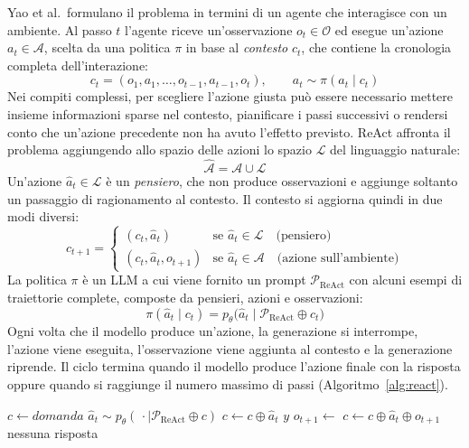 Yao et al.\ formulano il problema in termini di un agente che interagisce con un ambiente. Al passo $t$ l'agente riceve un'osservazione $o_t \in \mathcal{O}$ ed esegue un'azione $a_t \in \mathcal{A}$, scelta da una politica $\pi$ in base al \emph{contesto} $c_t$, che contiene la cronologia completa dell'interazione:
\[
c_t = (o_1, a_1, \dots, o_{t-1}, a_{t-1}, o_t), \qquad a_t \sim \pi(a_t \mid c_t)
\]
Nei compiti complessi, per scegliere l'azione giusta può essere necessario mettere insieme informazioni sparse nel contesto, pianificare i passi successivi o rendersi conto che un'azione precedente non ha avuto l'effetto previsto. ReAct affronta il problema aggiungendo allo spazio delle azioni lo spazio $\mathcal{L}$ del linguaggio naturale:
\[
\hat{\mathcal{A}} = \mathcal{A} \cup \mathcal{L}
\]
Un'azione $\hat{a}_t \in \mathcal{L}$ è un \emph{pensiero}, che non produce osservazioni e aggiunge soltanto un passaggio di ragionamento al contesto. Il contesto si aggiorna quindi in due modi diversi:
\[
c_{t+1} =
\begin{cases}
(c_t, \hat{a}_t) & \text{se } \hat{a}_t \in \mathcal{L} \quad \text{(pensiero)} \\[2pt]
(c_t, \hat{a}_t, o_{t+1}) & \text{se } \hat{a}_t \in \mathcal{A} \quad \text{(azione sull'ambiente)}
\end{cases}
\]
La politica $\pi$ è un LLM a cui viene fornito un prompt $\mathcal{P}_{\text{ReAct}}$ con alcuni esempi di traiettorie complete, composte da pensieri, azioni e osservazioni:
\[
\pi(\hat{a}_t \mid c_t) = p_\theta\big(\hat{a}_t \mid \mathcal{P}_{\text{ReAct}} \oplus c_t\big)
\]
Ogni volta che il modello produce un'azione, la generazione si interrompe, l'azione viene eseguita, l'osservazione viene aggiunta al contesto e la generazione riprende. Il ciclo termina quando il modello produce l'azione finale con la risposta oppure quando si raggiunge il numero massimo di passi (Algoritmo~\ref{alg:react}).

\begin{algorithm}[htbp]
\caption{Ciclo ReAct}
\label{alg:react}
\begin{algorithmic}[1]
    \State $c \gets domanda$
        \State $\hat{a}_t \sim p_\theta(\,\cdot \mid \mathcal{P}_{\text{ReAct}} \oplus c)$ 
         
            \State $c \gets c \oplus \hat{a}_t$
            \State \Return $y$
        \Else {}
            \State $o_{t+1} \gets$ 
            \State $c \gets c \oplus \hat{a}_t \oplus o_{t+1}$
        \EndIf
    \EndFor
    \State \Return nessuna risposta 
\EndFunction
\end{algorithmic}
\end{algorithm}

